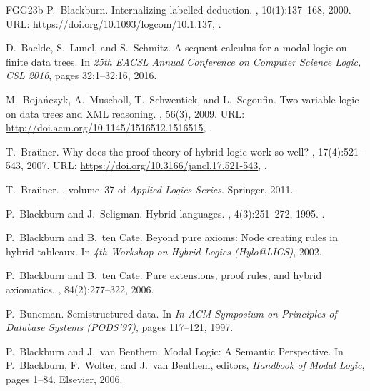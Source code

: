 \documentclass[10pt,a4paper]{amsart}
\theoremstyle{definition}
\theoremstyle{remark}
\begin{document}
\begin{thebibliography}{FGG{\etalchar{+}}23b}
P.~Blackburn.
\newblock Internalizing labelled deduction.
, 10(1):137--168, 2000.
\newblock URL: \url{https://doi.org/10.1093/logcom/10.1.137}, \href {https://doi.org/10.1093/LOGCOM/10.1.137} {}.

D.~Baelde, S.~Lunel, and S.~Schmitz.
\newblock A sequent calculus for a modal logic on finite data trees.
\newblock In {\em 25th {EACSL} Annual Conference on Computer Science Logic, {CSL} 2016}, pages 32:1--32:16, 2016.

M.~Boja{\'{n}}czyk, A.~Muscholl, T.~Schwentick, and L.~Segoufin.
\newblock Two-variable logic on data trees and {XML} reasoning.
, 56(3), 2009.
\newblock URL: \url{http://doi.acm.org/10.1145/1516512.1516515}, \href {https://doi.org/10.1145/1516512.1516515} {}.

T.~Bra{\"{u}}ner.
\newblock Why does the proof-theory of hybrid logic work so well?
, 17(4):521--543, 2007.
\newblock URL: \url{https://doi.org/10.3166/jancl.17.521-543}, \href {https://doi.org/10.3166/JANCL.17.521-543} {}.

T.~Bra\"uner.
, volume~37 of {\em Applied Logics Series}.
\newblock Springer, 2011.

P.~Blackburn and J.~Seligman.
\newblock Hybrid languages.
, 4(3):251--272, 1995.
\newblock \href {https://doi.org/10.1007/BF01049415} {}.

P.~Blackburn and B.~ten Cate.
\newblock Beyond pure axioms: Node creating rules in hybrid tableaux.
\newblock In {\em 4th Workshop on Hybrid Logics (Hylo@LICS)}, 2002.

P.~Blackburn and B.~ten Cate.
\newblock Pure extensions, proof rules, and hybrid axiomatics.
, 84(2):277--322, 2006.

P.~Buneman.
\newblock Semistructured data.
\newblock In {\em In {ACM} {S}ymposium on Principles of Database Systems ({PODS}'97)}, pages 117--121, 1997.

P.~Blackburn and J.~van Benthem.
\newblock Modal {L}ogic: {A} {S}emantic {P}erspective.
\newblock In P.~Blackburn, F.~Wolter, and J.~van Benthem, editors, {\em Handbook of Modal Logic}, pages 1--84. Elsevier, 2006.


\end{thebibliography}
\end{document}
